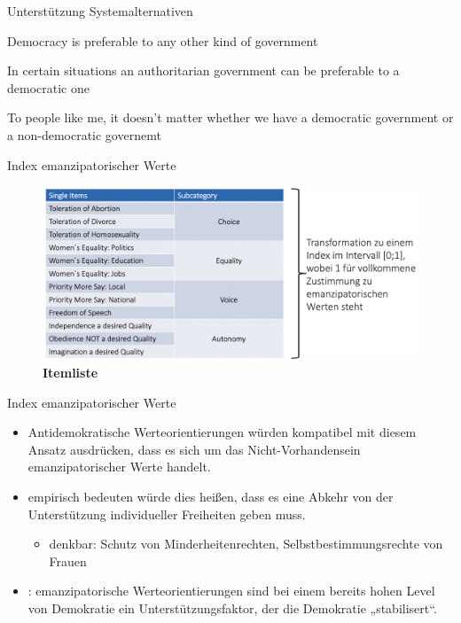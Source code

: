 \documentclass[11pt]{beamer}
\begin{document}
\begin{frame}{Unterstützung Systemalternativen}
	\begin{nolist}
		\item Democracy is preferable to any other kind of government
		\item In certain situations an authoritarian government can be preferable to a democratic one
		\item To people like me, it doesn't matter whether we have a democratic government or a non-democratic governemt \parencite[103]{Rose1998}
	\end{nolist}
\end{frame}

\begin{frame}{Index emanzipatorischer Werte \parencite[71]{Welzel2013}}
	\begin{figure}[ht]
		\includegraphics[width=\textwidth]{pics/s11-1.png}
		\caption{\textbf{Itemliste}}
	\end{figure}
\end{frame}

\begin{frame}{Index emanzipatorischer Werte \parencite[71]{Welzel2013}}
	\begin{itemize}
		\item Antidemokratische Werteorientierungen würden kompatibel mit diesem Ansatz ausdrücken, dass es sich um das Nicht-Vorhandensein emanzipatorischer Werte handelt.
		\item empirisch bedeuten würde dies heißen, dass es eine Abkehr von der Unterstützung individueller Freiheiten geben muss.
		\begin{itemize}
			\item denkbar: Schutz von Minderheitenrechten, Selbstbestimmungsrechte von Frauen
		\end{itemize}
		\item \cite[399]{Welzel2007}: emanzipatorische Werteorientierungen sind bei einem bereits hohen Level von Demokratie ein Unterstützungsfaktor, der die Demokratie „stabilisert“.
	\end{itemize}
\end{frame}
\end{document}
